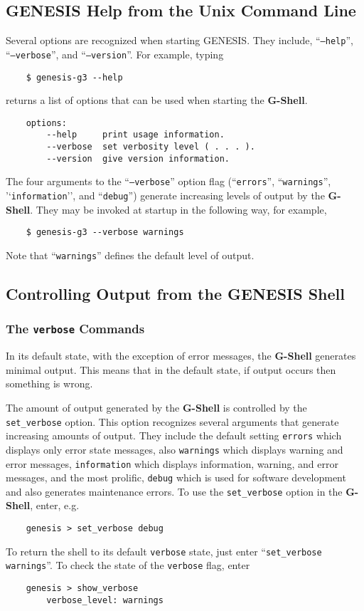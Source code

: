 \documentclass[12pt]{article}
\begin{document}
\subsection*{GENESIS Help from the Unix Command Line}
Several options are recognized when starting GENESIS. They include, ``{\tt --help}'', ``{\tt --verbose}'', and ``{\tt --version}''. For example, typing
\begin{verbatim}
    $ genesis-g3 --help
\end{verbatim}
returns a list of options that can be used when starting the {\bf G-Shell}.
\begin{verbatim}
    options:
        --help     print usage information.
        --verbose  set verbosity level ( . . . ).
        --version  give version information.
\end{verbatim}
The four arguments to the ``{\tt --verbose}'' option flag (``{\tt errors}'', ``{\tt warnings}'', '`{\tt information}'', and ``{\tt debug}'') generate increasing levels of output by the {\bf G-Shell}. They may be invoked at startup in the following way, for example,
\begin{verbatim}
    $ genesis-g3 --verbose warnings
\end{verbatim}
Note that ``{\tt warnings}'' defines the default level of output.

\subsection*{Controlling Output from the GENESIS Shell}

\subsubsection*{The {\tt verbose} Commands}

In its default state, with the exception of error messages, the {\bf G-Shell} generates minimal output. This means that in the default state, if output occurs then something is wrong.

The amount of output generated by the {\bf G-Shell} is controlled by the {\tt set\_verbose} option.  This option recognizes several arguments that generate increasing amounts of output. They include the default setting {\tt errors} which displays only error state messages, also {\tt warnings} which displays warning and error messages, {\tt information} which displays information, warning, and error messages, and the most prolific, {\tt debug} which is used for software development and also generates maintenance errors. To use the {\tt set\_verbose} option in the {\bf G-Shell}, enter, e.g.
\begin{verbatim}
    genesis > set_verbose debug
\end{verbatim}
To return the shell to its default {\tt verbose} state, just enter ``{\tt set\_verbose warnings}''.  To check the state of the {\tt verbose} flag, enter
\begin{verbatim}
    genesis > show_verbose
        verbose_level: warnings
\end{verbatim}
\end{document}

